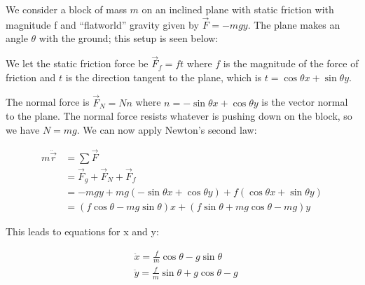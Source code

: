 \documentclass[main.tex]{subfiles}
\begin{document}
\begin{appendices}
We consider a block of mass $m$ on an inclined plane with static friction with magnitude
f and ``flatworld'' gravity  given by $\vec{F}  = -mg\unit{y}$. The plane makes an angle
$\theta$ with the ground; this setup is seen below:

\begin{figure}[h]
\label{fig: block-ramp}
\end{figure}

We let the static friction force be $\vec{F}_f = f \unit{t}$ where $f$ is the magnitude
of the force of friction and $\unit{t}$ is the direction tangent to the plane, which is
$\unit{t} = \cos \theta \unit{x} + \sin \theta \unit{y}$.

The normal force is $\vec{F}_N = N \unit{n}$ where $\unit{n} = - \sin \theta \unit{x} +
\cos \theta \unit{y}$ is the vector normal to the plane. The normal force resists whatever
is pushing down on the block, so we have $N = mg$. We can now apply Newton's second
law:

\begin{align*}
m \ddot{\vec{r}} &= \sum \vec{F} \\
&= \vec{F}_g + \vec{F}_N + \vec{F}_f \\
&= -mg\unit{y} + mg \left(- \sin \theta \unit{x} + \cos \theta \unit{y} \right) + f \left(
\cos \theta \unit{x} + \sin \theta \unit{y} \right) \\
&= \left( f \cos \theta - mg \sin \theta \right) \unit{x} + \left( f \sin \theta + mg \cos
\theta - mg \right) \unit{y}
\end{align*}

This leads to equations for x and y:

\begin{align*}
&\ddot{x} = \frac{f}{m} \cos \theta - g \sin \theta \\
&\ddot{y} = \frac{f}{m} \sin \theta + g \cos \theta - g
\end{align*}


\end{appendices}
\end{document}
